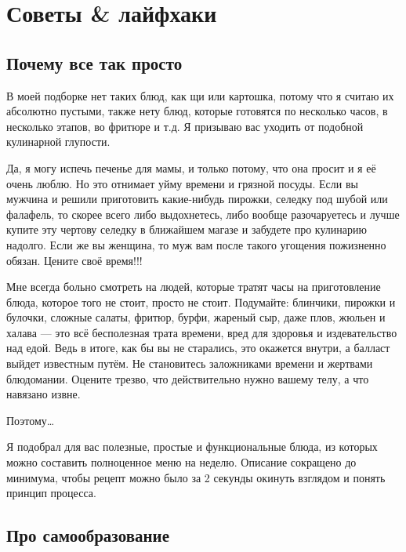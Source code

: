 \chapter{Советы \& лайфхаки}

\section{Почему все так просто}

В моей подборке нет таких блюд, как щи или картошка, потому что я считаю их абсолютно пустыми, также нету блюд, которые готовятся по несколько часов, в несколько этапов, во фритюре и т.д. Я призываю вас уходить от подобной кулинарной глупости.

Да, я могу испечь печенье для мамы, и только потому, что она просит и я её очень люблю. Но это отнимает уйму времени и грязной посуды. Если вы мужчина и решили приготовить какие-нибудь пирожки, селедку под шубой или фалафель, то скорее всего либо выдохнетесь, либо вообще разочаруетесь и лучше купите эту чертову селедку в ближайшем магазе и забудете про кулинарию надолго. Если же вы женщина, то муж вам после такого угощения пожизненно обязан. Цените своё время!!!

Мне всегда больно смотреть на людей, которые тратят часы на приготовление блюда, которое того не стоит, просто не стоит. Подумайте: блинчики, пирожки и булочки, сложные салаты, фритюр, бурфи, жареный сыр, даже плов, жюльен и халава — это всё бесполезная трата времени, вред для здоровья и издевательство над едой. Ведь в итоге, как бы вы не старались, это окажется внутри, а балласт выйдет известным путём. Не становитесь заложниками времени и жертвами блюдомании. Оцените трезво, что действительно нужно вашему телу, а что навязано извне.

Поэтому\ldots

Я подобрал для вас полезные, простые и функциональные блюда, из которых можно составить полноценное меню на неделю. Описание сокращено до минимума, чтобы рецепт можно было за 2 секунды окинуть взглядом и понять принцип процесса.

\section{Про самообразование}

